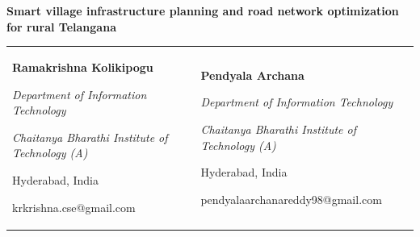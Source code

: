 \documentclass[12pt,a4paper]{article}
\newif\ifanon
\begin{document}
\begin{center}
{\large\bfseries Smart village infrastructure planning and road network optimization for rural Telangana\par}
\vspace{0.2em}
\ifanon
{\large [Authors withheld for double-anonymous review]\par}
\else
\small\begin{tabular}{@{}p{}p{}@{}}
\centering\textbf{Ramakrishna Kolikipogu}\par
\centering\textit{Department of Information Technology}\par
\centering\textit{Chaitanya Bharathi Institute of Technology (A)}\par
\centering Hyderabad, India\par
\centering krkrishna.cse@gmail.com\par
&
\centering\textbf{Pendyala Archana}\par
\centering\textit{Department of Information Technology}\par
\centering\textit{Chaitanya Bharathi Institute of Technology (A)}\par
\centering Hyderabad, India\par
\centering pendyalaarchanareddy98@gmail.com\par
\end{tabular}\\[0.3em]
\fi
\end{center}
\vspace{-0.9em}
\end{document}

